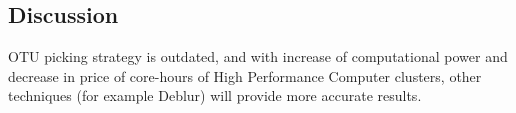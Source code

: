 \documentclass{article}
\begin{document}
\begin{multicols}{2}
\section{Discussion}
OTU picking strategy is outdated, and with increase of computational power and decrease in price of core-hours of High Performance Computer clusters, other techniques (for example Deblur\cite{Amir}) will provide more accurate results.
\newpage


\end{multicols}
\end{document}
